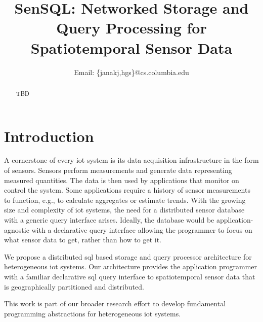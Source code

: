 \documentclass[conference,10pt]{IEEEtran}
\newcommand{\papertitle}{SenSQL: Networked Storage and Query Processing for Spatiotemporal Sensor Data}
\begin{document}
\title{\papertitle}

\author{
  Email: \{janakj,hgs\}@cs.columbia.edu
}

\maketitle

\begin{abstract}
TBD
\end{abstract}

\glsresetall

\section{Introduction}\label{sec:introduction}

A cornerstone of every \gls{iot} system is its data acquisition infrastructure in the form of sensors. Sensors perform measurements and generate data representing measured quantities. The data is then used by applications that monitor on control the system. Some applications require a history of sensor measurements to function, e.g., to calculate aggregates or estimate trends. With the growing size and complexity of \gls{iot} systems, the need for a distributed sensor database with a generic query interface arises. Ideally, the database would be application-agnostic with a declarative query interface allowing the programmer to focus on what sensor data to get, rather than how to get it.

We propose a distributed \gls{sql} based storage and query processor architecture for heterogeneous \gls{iot} systems. Our architecture provides the application programmer with a familiar declarative \gls{sql} query interface to spatiotemporal sensor data that is geographically partitioned and distributed.

This work is part of our broader research effort to develop fundamental programming abstractions for heterogeneous \gls{iot} systems.


%
\end{document}
